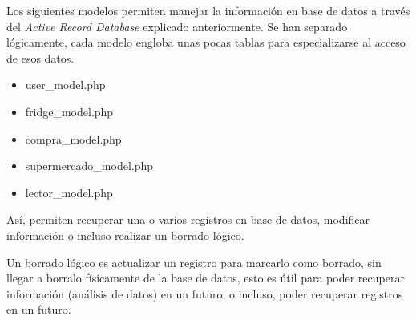         Los siguientes modelos permiten manejar la información en base de datos a través del \emph{Active Record Database} explicado anteriormente. Se han separado lógicamente, cada modelo engloba unas pocas tablas para especializarse al acceso de esos datos.

        \begin{itemize}
            \item user\_model.php
            \item fridge\_model.php
            \item compra\_model.php
            \item supermercado\_model.php
            \item lector\_model.php
        \end{itemize}

        Así, permiten recuperar una o varios registros en base de datos, modificar información o incluso realizar un borrado lógico.

        Un borrado lógico es actualizar un registro para marcarlo como borrado, sin llegar a borralo físicamente de la base de datos, esto es útil para poder recuperar información (análisis de datos) en un futuro, o incluso, poder recuperar registros en un futuro.